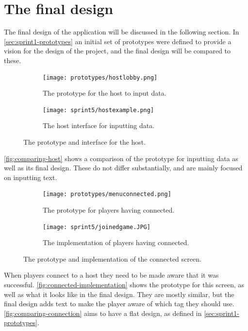 \section{The final design}\label{sec:final-design}
The final design of the application will be discussed in the following section.
In \autoref{sec:sprint1-prototypes} an initial set of prototypes were defined to provide a vision for the design of the project, and the final design will be compared to these.
\begin{figure}[H]
    \centering
    \begin{subfigure}{0.45\textwidth}
        \centering
        \texttt{[image: prototypes/hostlobby.png]}
        \caption{The prototype for the host to input data.}
        \label{fig:host-prototype}
    \end{subfigure}
    \begin{subfigure}{0.45\textwidth}
        \centering
        \texttt{[image: sprint5/hostexample.png]}
        \caption{The host interface for inputting data.}
        \label{fig:host-interface}
    \end{subfigure}
    \caption{The prototype and interface for the host.}
    \label{fig:comparing-host}
\end{figure}
\noindent
\autoref{fig:comparing-host} shows a comparison of the prototype for inputting data as well as its final design.
These do not differ substantially, and are mainly focused on inputting text.

\begin{figure}[H]
    \centering
    \begin{subfigure}{0.45\textwidth}
        \centering
        \texttt{[image: prototypes/menuconnected.png]}
        \caption{The prototype for players having connected.}
        \label{fig:connected-prototype}
    \end{subfigure}
    \begin{subfigure}{0.45\textwidth}
        \centering
        \texttt{[image: sprint5/joinedgame.JPG]}
        \caption{The implementation of players having connected.}
        \label{fig:connected-implementation}
    \end{subfigure}
    \caption{The prototype and implementation of the connected screen.}
    \label{fig:comparing-connection}
\end{figure}
\noindent
When players connect to a host they need to be made aware that it was successful.
\autoref{fig:connected-implementation} shows the prototype for this screen, as well as what it looks like in the final design.
They are mostly similar, but the final design adds text to make the player aware of which tag they should use.
\autoref{fig:comparing-connection} aims to have a flat design, as defined in \autoref{sec:sprint1-prototypes}.

